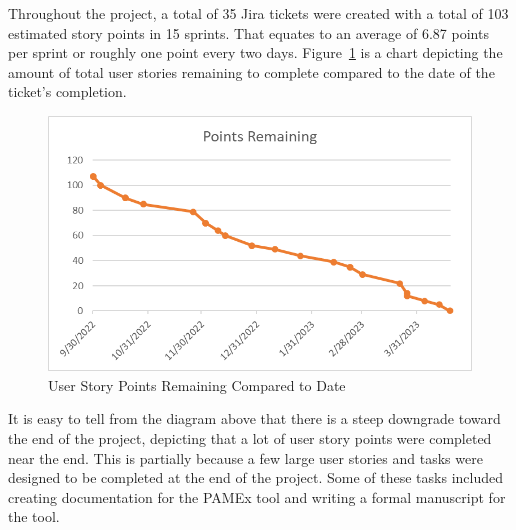 Throughout the project, a total of 35 Jira tickets were created 
with a total of 103 estimated story points in 15 sprints. That equates 
to an average of 6.87 points per sprint or roughly one point every two 
days. Figure~\ref{Points Remaining Diagram} is a chart depicting the amount of total user stories 
remaining to complete compared to the date of the ticket’s 
completion. 

\begin{figure}[h]
\centering
\includegraphics[width=.8\textwidth]{section03/assets/jira-points.png}
\caption[User Story Points Remaining Compared to Date Diagram]{\label{Points Remaining Diagram}User Story Points Remaining Compared to Date}
\end{figure}

\vspace{\baselineskip}

It is easy to tell from the diagram above that there is a steep downgrade toward the end of 
the project, depicting that a lot of user story points were completed 
near the end. This is partially because a 
few large user stories and tasks were designed to be completed at 
the end of the project. Some of these tasks included creating 
documentation for the PAMEx tool and writing a formal manuscript for 
the tool.  

